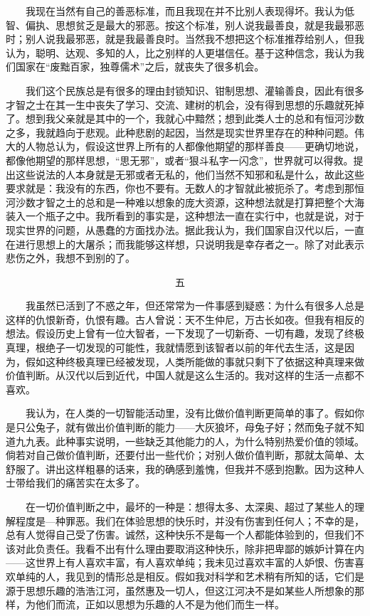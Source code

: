 　　我现在当然有自己的善恶标准，而且我现在并不比别人表现得坏。我认为低智、偏执、思想贫乏是最大的邪恶。按这个标准，别人说我最善良，就是我最邪恶时；别人说我最邪恶，就是我最善良时。当然我不想把这个标准推荐给别人，但我认为，聪明、达观、多知的人，比之别样的人更堪信任。基于这种信念，我认为我们国家在“废黜百家，独尊儒术”之后，就丧失了很多机会。 

　　我们这个民族总是有很多的理由封锁知识、钳制思想、灌输善良，因此有很多才智之士在其一生中丧失了学习、交流、建树的机会，没有得到思想的乐趣就死掉了。想到我父亲就是其中的一个，我就心中黯然；想到此类人士的总和有恒河沙数之多，我就趋向于悲观。此种悲剧的起因，当然是现实世界里存在的种种问题。伟大的人物总认为，假设这世界上所有的人都像他期望的那样善良——更确切地说，都像他期望的那样思想，“思无邪”，或者“狠斗私字一闪念”，世界就可以得救。提出这些说法的人本身就是无邪或者无私的，他们当然不知邪和私是什么，故此这些要求就是：我没有的东西，你也不要有。无数人的才智就此被扼杀了。考虑到那恒河沙数才智之土的总和是一种难以想象的庞大资源，这种想法就是打算把整个大海装入一个瓶子之中。我所看到的事实是，这种想法一直在实行中，也就是说，对于现实世界的问题，从愚蠢的方面找办法。据此我认为，我们国家自汉代以后，一直在进行思想上的大屠杀；而我能够这样想，只说明我是幸存者之一。除了对此表示悲伤之外，我想不到别的了。 


　　　　　　　　　　　　　　　　　五 

　　我虽然已活到了不惑之年，但还常常为一件事感到疑惑：为什么有很多人总是这样的仇恨新奇，仇恨有趣。古人曾说：天不生仲尼，万古长如夜。但我有相反的想法。假设历史上曾有一位大智者，一下发现了一切新奇、一切有趣，发现了终极真理，根绝子一切发现的可能性，我就情愿到该智者以前的年代去生活，这是因为，假如这种终极真理已经被发现，人类所能做的事就只剩下了依据这种真理来做价值判断。从汉代以后到近代，中国人就是这么生活的。我对这样的生活一点都不喜欢。 

　　我认为，在人类的一切智能活动里，没有比做价值判断更简单的事了。假如你是只公兔子，就有做出价值判断的能力——大灰狼坏，母兔子好；然而兔子就不知道九九表。此种事实说明，一些缺乏其他能力的人，为什么特别热爱价值的领域。倘若对自己做价值判断，还要付出一些代价；对别人做价值判断，那就太简单、太舒服了。讲出这样粗暴的话来，我的确感到羞愧，但我并不感到抱歉。因为这种人士带给我们的痛苦实在太多了。 

　　在一切价值判断之中，最坏的一种是：想得太多、太深奥、超过了某些人的理解程度是—种罪恶。我们在体验思想的快乐时，并没有伤害到任何人；不幸的是，总有人觉得自己受了伤害。诚然，这种快乐不是每一个人都能体验到的，但我们不该对此负责任。我看不出有什么理由要取消这种快乐，除非把卑鄙的嫉妒计算在内 ——这世界上有人喜欢丰富，有人喜欢单纯；我未见过喜欢丰富的人妒恨、伤害喜欢单纯的人，我见到的情形总是相反。假如我对科学和艺术稍有所知的话，它们是源于思想乐趣的浩浩江河，虽然惠及一切人，但这江河决不是如某些人所想象的那样，为他们而流，正如以思想为乐趣的人不是为他们而生一样。 

